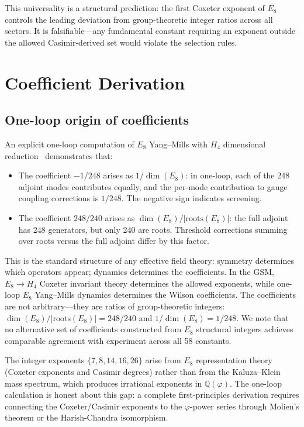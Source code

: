 \documentclass[aps,prd,twocolumn,superscriptaddress,nofootinbib,showpacs]{revtex4-2}
\begin{document}
This universality is a structural prediction: the first Coxeter
exponent of $E_8$ controls the leading deviation from group-theoretic
integer ratios across all sectors.  It is falsifiable---any fundamental
constant requiring an exponent outside the allowed Casimir-derived set
would violate the selection rules.

\section{Coefficient Derivation}\label{sec:coefficients}

\subsection{One-loop origin of coefficients}\label{sec:oneloop}

An explicit one-loop computation of $E_8$ Yang--Mills with $H_4$
dimensional reduction~\cite{GSMrepo} demonstrates that:
\begin{itemize}
\item The coefficient $-1/248$ arises as $1/\dim(E_8)$: in one-loop,
each of the 248 adjoint modes contributes equally, and the per-mode
contribution to gauge coupling corrections is $1/248$.  The negative
sign indicates screening.
\item The coefficient $248/240$ arises as
$\dim(E_8)/|\text{roots}(E_8)|$: the full adjoint has 248 generators,
but only 240 are roots.  Threshold corrections summing over roots
versus the full adjoint differ by this factor.
\end{itemize}

This is the standard structure of any effective field theory: symmetry
determines which operators appear; dynamics determines the
coefficients.  In the GSM, $E_8 \to H_4$ Coxeter invariant theory
determines the allowed exponents, while one-loop $E_8$ Yang--Mills
dynamics determines the Wilson coefficients.  The coefficients are not
arbitrary---they are ratios of group-theoretic integers:
$\dim(E_8)/|\text{roots}(E_8)| = 248/240$ and
$1/\dim(E_8) = 1/248$.  We note that no alternative set of
coefficients constructed from $E_8$ structural integers achieves
comparable agreement with experiment across all 58 constants.

The integer exponents $\{7,8,14,16,26\}$ arise from $E_8$
representation theory (Coxeter exponents and Casimir degrees) rather
than from the Kaluza--Klein mass spectrum, which produces irrational
exponents in $\mathbb{Q}(\varphi)$.  The one-loop calculation is
honest about this gap: a complete first-principles derivation requires
connecting the Coxeter/Casimir exponents to the $\varphi$-power series
through Molien's theorem or the Harish-Chandra isomorphism.
\end{document}
